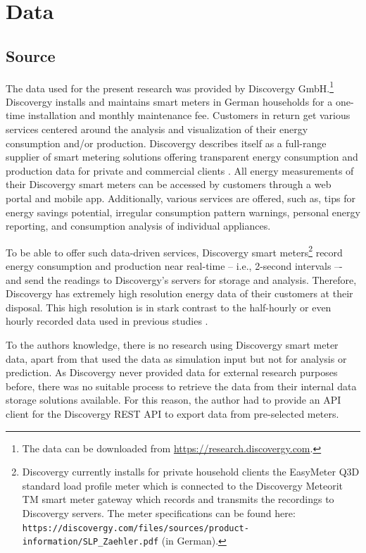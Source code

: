 
\section{Data}\label{Sec:Data}




\subsection{Source}\label{Sec:Data;Subsec:Source}

The data used for the present research was provided by Discovergy GmbH.\footnote{The data can be downloaded from \url{https://research.discovergy.com}.} Discovergy installs and maintains smart meters in German households for a one-time installation and monthly maintenance fee. Customers in return get various services centered around the analysis and visualization of their energy consumption and/or production. Discovergy describes itself as a full-range supplier of smart metering solutions offering transparent energy consumption and production data for private and commercial clients \citep{Discovergy:2018}. All energy measurements of their Discovergy smart meters can be accessed by customers through a web portal and mobile app. Additionally, various services are offered, such as, tips for energy savings potential, irregular consumption pattern warnings, personal energy reporting, and consumption analysis of individual appliances.

To be able to offer such data-driven services, Discovergy smart meters\footnote{Discovergy currently installs for private household clients the EasyMeter Q3D standard load profile meter which is connected to the Discovergy Meteorit TM smart meter gateway which records and transmits the recordings to Discovergy servers. The meter specifications can be found here: \texttt{https://discovergy.com/files/sources/product-information/SLP\_Zaehler.pdf} (in German).} record energy consumption and production near real-time -- i.e., 2-second intervals –- and send the readings to Discovergy's servers for storage and analysis. Therefore, Discovergy has extremely high resolution energy data of their customers at their disposal. This high resolution is in stark contrast to the half-hourly or even hourly recorded data used in previous studies \cite[e.g.,][]{Arora:2016,Auder:2018,Shi:2017,Gerossier:2017}.

To the authors knowledge, there is no research using Discovergy smart meter data, apart from \cite{Teixeira:2017} that used the data as simulation input but not for analysis or prediction. As Discovergy never provided data for external research purposes before, there was no suitable process to retrieve the data from their internal data storage solutions available. For this reason, the author had to provide an API client for the Discovergy REST API to export data from pre-selected meters.


